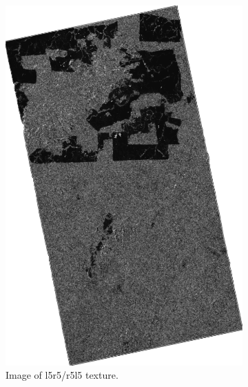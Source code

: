 \begin{figure}[H]\ContinuedFloat
  \centering
  \begin{subfigure}[b]{0.4\linewidth}
    \includegraphics[width=\linewidth]{Chapter4/laws_textures/l5r5_r5l5image.png}
     \caption{Image of l5r5/r5l5 texture.}
  \end{subfigure}
  \centering
  \begin{subfigure}[b]{0.4\linewidth}

\end{subfigure}
\end{figure}
